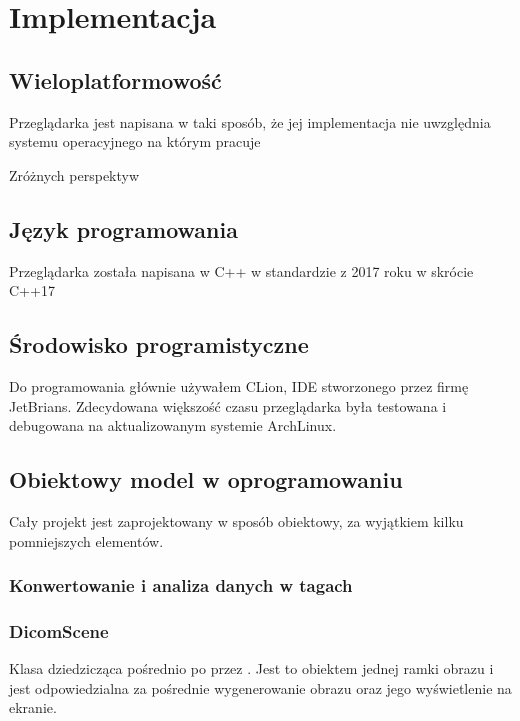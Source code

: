 \section{Implementacja}

\subsection{Wieloplatformowość}

Przeglądarka jest napisana w taki sposób, że jej implementacja nie uwzględnia systemu operacyjnego na którym pracuje

Zróżnych perspektyw

\subsection{Język programowania}

Przeglądarka została napisana w C++ w standardzie z 2017 roku w skrócie C++17

\subsection{Środowisko programistyczne}

Do programowania głównie używałem CLion, IDE stworzonego przez firmę JetBrians.
Zdecydowana większość czasu przeglądarka była testowana i debugowana na aktualizowanym systemie ArchLinux.

\subsection{Obiektowy model w oprogramowaniu}

Cały projekt jest zaprojektowany w sposób obiektowy, za wyjątkiem kilku pomniejszych elementów.


\subsubsection{Konwertowanie i analiza danych w tagach}


\subsubsection{DicomScene}

Klasa dziedzicząca pośrednio po  przez .
Jest to obiektem jednej ramki obrazu i jest odpowiedzialna za pośrednie wygenerowanie obrazu oraz jego wyświetlenie na ekranie.

